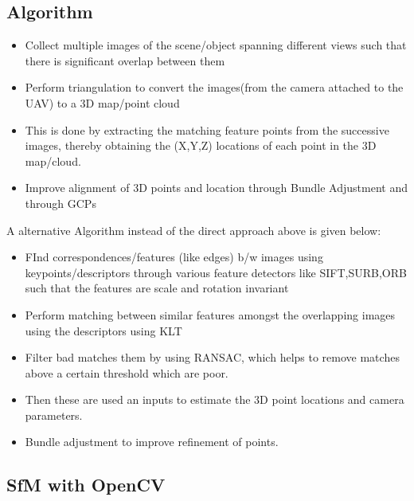 \documentclass{article}[11pt]
\begin{document}
\subsection{Algorithm}
\begin{itemize}
    \item Collect multiple images of the scene/object spanning different views such that there is significant overlap between them
    \item Perform triangulation to convert the images(from the camera attached to the UAV) to a 3D map/point cloud
    \item This is done by extracting the matching feature points from the successive images, thereby obtaining the (X,Y,Z) locations of each point in the 3D map/cloud.
    \item Improve alignment of 3D points and location through Bundle Adjustment and through GCPs
    
\end{itemize}

A alternative Algorithm instead of the direct approach above is given below:

\begin{itemize}
    \item FInd correspondences/features (like edges) b/w images using keypoints/descriptors through various feature detectors like SIFT,SURB,ORB such that the features are scale and rotation invariant
    \item Perform matching between similar features amongst the overlapping images using the descriptors using KLT
    \item Filter bad matches them by using RANSAC, which helps to remove matches above a certain threshold which are poor.
    \item Then these are used an inputs to estimate the 3D point locations and camera parameters.
    \item Bundle adjustment to improve refinement of points.
\end{itemize}


\subsection{SfM with OpenCV}
\end{document}
